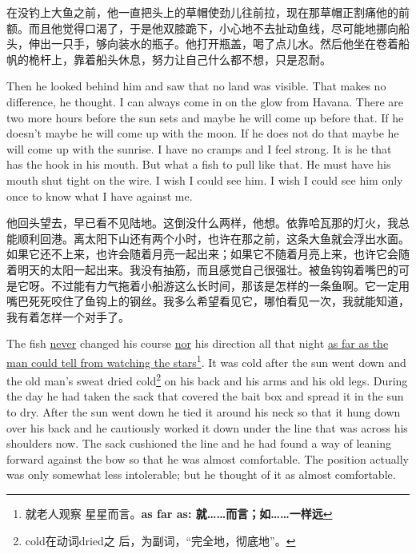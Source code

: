 \begin{paracol}{2}
\switchcolumn

在没钓上大鱼之前，他一直把头上的草帽使劲儿往前拉，现在那草帽正割痛他的前额。而且他觉得口渴了，于是他双膝跪下，小心地不去扯动鱼线，尽可能地挪向船头，伸出一只手，够向装水的瓶子。他打开瓶盖，喝了点儿水。然后他坐在卷着船帆的桅杆上，靠着船头休息，努力让自己什么都不想，只是忍耐。

\switchcolumn*


Then he looked behind him and saw that no land was \gls{visible}. That makes no
difference, he thought. I can always come in on the \gls{glow} from Havana.
There are two more hours before the sun sets and maybe he will come up
before that. If he doesn't maybe he will come up with the moon. If he does
not do that maybe he will come up with the sunrise. I have no \glspl{cramp}
and I feel strong. It is he that has the hook in his mouth. But what a fish
to pull like that. He must have his mouth shut \gls{tight} on the wire. I
wish I could see him. I wish I could see him only once to know what I have
against me.

\switchcolumn

他回头望去，早已看不见陆地。这倒没什么两样，他想。依靠哈瓦那的灯火，我总能顺利回港。离太阳下山还有两个小时，也许在那之前，这条大鱼就会浮出水面。如果它还不上来，也许会随着月亮一起出来；如果它不随着月亮上来，也许它会随着明天的太阳一起出来。我没有抽筋，而且感觉自己很强壮。被鱼钩钩着嘴巴的可是它呀。不过能有力气拖着小船游这么长时间，那该是怎样的一条鱼啊。它一定用嘴巴死死咬住了鱼钩上的钢丝。我多么希望看见它，哪怕看见一次，我就能知道，我有着怎样一个对手了。

\switchcolumn*


The fish \uline{never} changed his \gls{course} \uline{nor} his direction all that night
\uline{as far as the man could tell from watching the stars}\footnote{就老人观察
  星星而言。\textbf{as far as: 就……而言；如……一样远}}. It was cold after the sun
went down and the old man's sweat dried cold\footnote{cold在动词dried之
  后，为副词，“完全地，彻底地”。} on his back and his arms and his old
legs. During the day he had taken the sack that covered the bait box and
spread it in the sun to dry. After the sun went down he tied it around his
neck so that it hung down over his back and he \gls{cautiously} worked it
down under the line that was across his shoulders now. The sack
\gls{cushioned} the line and he had found a way of leaning forward against
the bow so that he was almost \gls{comfortable}. The position actually was only
\gls{somewhat} less \gls{intolerable}; but he thought of it as almost comfortable.


\end{paracol}
